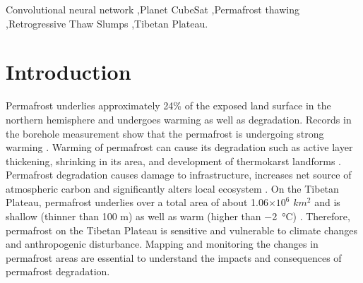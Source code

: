 \documentclass[preprint,12pt,authoryear]{elsarticle}
\begin{document}
\begin{frontmatter}
\begin{abstract}

\end{abstract}

\begin{keyword}


Convolutional neural network \sep Planet CubeSat  \sep Permafrost thawing  \sep Retrogressive Thaw Slumps \sep Tibetan Plateau.

\end{keyword}

\end{frontmatter}


\section{Introduction}
\label{sec_intro}

Permafrost underlies approximately 24\% of the exposed land surface in the northern hemisphere \citep{zhang_statistics_1999} and undergoes warming as well as degradation. Records in the borehole measurement show that the permafrost is undergoing strong warming \citep{marchenko_permafrost_2007,osterkamp2005recent,romanovsky_thermal_2010,romanovsky_permafrost_2010,wu_recent_2008,zhao_thermal_2010}. Warming of permafrost can cause its degradation such as active layer thickening, shrinking in its area, and development of thermokarst landforms \citep{zhao_thermal_2010,akerman_thawing_2008,czudek_thermokarst_1970,jorgenson_response_2005,osterkamp_characteristics_2007}. Permafrost degradation causes damage to infrastructure, increases net source of atmospheric carbon and significantly alters local ecosystem \citep{tong_effect_1996,grosse_vulnerability_2011,olefeldt_circumpolar_2016,schuur_climate_2015,tarnocai_soil_2009,schuster2018permafrost}. On the Tibetan Plateau, permafrost underlies over a total area of about 1.06$\times10^6$ $km^2$ and is shallow (thinner than 100 m) as well as warm (higher than \SI{-2}{\celsius}) \citep{zhou_geocryology_2000}. Therefore, permafrost on the Tibetan Plateau is sensitive and vulnerable to climate changes and anthropogenic disturbance. Mapping and monitoring the changes in permafrost areas are essential to understand the impacts and consequences of permafrost degradation. 
\end{document}
